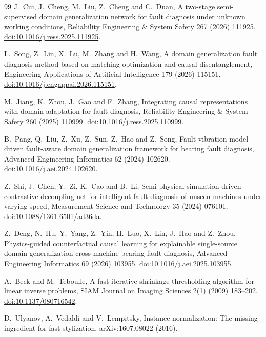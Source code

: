\begin{thebibliography}{99}
J.~Cui, J.~Cheng, M.~Liu, Z.~Cheng and C.~Duan,
A two-stage semi-supervised domain generalization network for fault diagnosis under unknown working conditions,
Reliability Engineering \& System Safety 267 (2026) 111925.
\href{https://doi.org/10.1016/j.ress.2025.111925}{doi:10.1016/j.ress.2025.111925}.

L.~Song, Z.~Lin, X.~Lu, M.~Zhang and H.~Wang,
A domain generalization fault diagnosis method based on matching optimization
and causal disentanglement,
Engineering Applications of Artificial Intelligence 179 (2026) 115151.
\href{https://doi.org/10.1016/j.engappai.2026.115151}{doi:10.1016/j.engappai.2026.115151}.

M.~Jiang, K.~Zhou, J.~Gao and F.~Zhang,
Integrating causal representations with domain adaptation for fault diagnosis,
Reliability Engineering \& System Safety 260 (2025) 110999.
\href{https://doi.org/10.1016/j.ress.2025.110999}{doi:10.1016/j.ress.2025.110999}.

B.~Pang, Q.~Liu, Z.~Xu, Z.~Sun, Z.~Hao and Z.~Song,
Fault vibration model driven fault-aware domain generalization framework
for bearing fault diagnosis,
Advanced Engineering Informatics 62 (2024) 102620.
\href{https://doi.org/10.1016/j.aei.2024.102620}{doi:10.1016/j.aei.2024.102620}.

Z.~Shi, J.~Chen, Y.~Zi, K.~Cao and B.~Li,
Semi-physical simulation-driven contrastive decoupling net for intelligent
fault diagnosis of unseen machines under varying speed,
Measurement Science and Technology 35 (2024) 076101.
\href{https://doi.org/10.1088/1361-6501/ad36da}{doi:10.1088/1361-6501/ad36da}.

Z.~Deng, N.~Hu, Y.~Yang, Z.~Yin, H.~Luo, X.~Lin, J.~Hao and Z.~Zhou,
Physics-guided counterfactual causal learning for explainable single-source
domain generalization cross-machine bearing fault diagnosis,
Advanced Engineering Informatics 69 (2026) 103955.
\href{https://doi.org/10.1016/j.aei.2025.103955}{doi:10.1016/j.aei.2025.103955}.

A.~Beck and M.~Teboulle,
A fast iterative shrinkage-thresholding algorithm for linear inverse problems,
SIAM Journal on Imaging Sciences 2(1) (2009) 183--202.
\href{https://doi.org/10.1137/080716542}{doi:10.1137/080716542}.

D.~Ulyanov, A.~Vedaldi and V.~Lempitsky,
Instance normalization: The missing ingredient for fast stylization,
arXiv:1607.08022 (2016).


\end{thebibliography}
